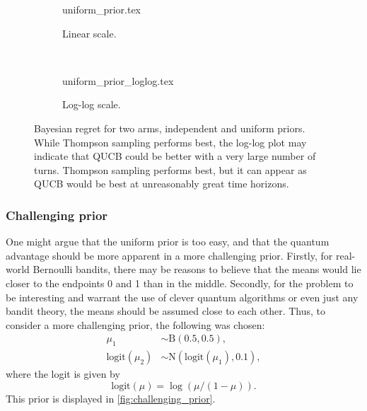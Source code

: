 \begin{figure}
    \centering
    \begin{subfigure}{\textwidth}
        \centering
        \newcommand{\myoptions}{
            width=10cm,
            height=8cm,
            xlabel={Kiloturn},
            ylabel={Regret},
            legend entries={UCB, QUCB, Thompson},
            legend pos=north west,
            legend cell align=left,
            mystyle,
            ymax = 150,
        }
        {uniform_prior.tex}
        \caption{Linear scale.}
    \end{subfigure}
    \\[3ex]
    \begin{subfigure}{\textwidth}
        \centering
        \newcommand{\myoptions}{
            width=10cm,
            height=8cm,
            xlabel={Turn},
            ylabel={Regret},
            legend entries={UCB, QUCB, Thompson},
            legend pos=north west,
            legend cell align=left,
            mystyle,
        }
        {uniform_prior_loglog.tex}
        \caption{Log-log scale.}
    \end{subfigure}
    \caption[
        Bayesian regret for two arms, independent and uniform priors.
    ]
    {
        Bayesian regret for two arms, independent and uniform priors.
        While Thompson sampling performs best, the log-log plot may indicate that QUCB could be better with a very large number of turns.
        Thompson sampling performs best, but it can appear as QUCB would be best at unreasonably great time horizons.
    }
    \label{fig:random}
\end{figure}


\subsubsection{Challenging prior}
One might argue that the uniform prior is too easy, and that the quantum advantage should be more apparent in a more challenging prior.
Firstly, for real-world Bernoulli bandits, there may be reasons to believe that the means would lie closer to the endpoints 0 and 1 than in the middle.
Secondly, for the problem to be interesting and warrant the use of clever quantum algorithms or even just any bandit theory, the means should be assumed close to each other.
Thus, to consider a more challenging prior, the following was chosen:
\begin{equation}
    \label{eq:challenging_prior}
    \begin{aligned}
        \mu_1               & \sim \text{B}(0.5, 0.5),                 \\
        \text{logit}(\mu_2) & \sim \text{N}(\text{logit}(\mu_1), 0.1),
    \end{aligned}
\end{equation}
where the logit is given by
\begin{equation}
    \label{eq:logit}
    \text{logit}(\mu) = \log(\mu/(1-\mu)).
\end{equation}
This prior is displayed in \cref{fig:challenging_prior}.

